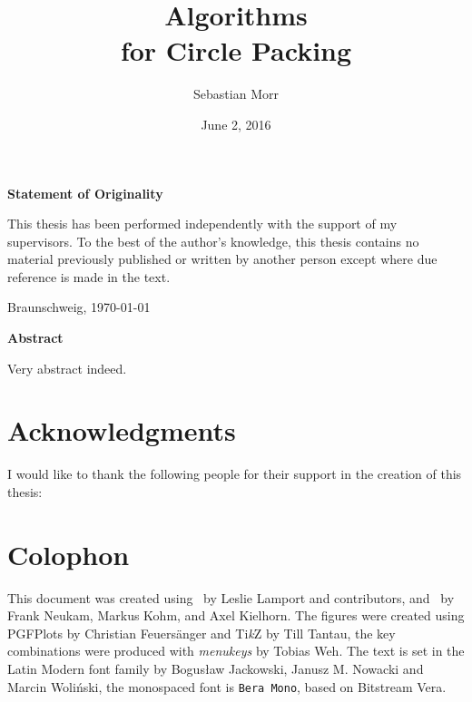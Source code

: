 \documentclass[%
    a4paper,              %
    style=print,          %
    bibliography=totoc,   %
    nexus,                %
    lnum,                 %
    extramargin,          %
]{tubsbook}
\title{Algorithms\\for Circle Packing}
\author{\sffamily\LARGE Sebastian Morr}
\date{\large June 2, 2016}
\begin{document}
\frontmatter %

\maketitle
\cleardoublepage

\thispagestyle{plain} %
\vspace*{7cm}
\centerline{\bfseries Statement of Originality}
\vspace*{1em}
\noindent
This thesis has been performed independently with the support of my supervisors.
To the best of the author's knowledge, this thesis contains no material previously
published or written by another person except where due reference is made in the text.

\par
  \bigskip\noindent Braunschweig, \today \par
  \vspace*{10mm}
  \hfill\hrulefill
\cleardoublepage

\thispagestyle{plain} %
\centerline{\bfseries Abstract}
\vspace*{1em}
\noindent
Very abstract indeed.
\cleardoublepage

%

\section*{Acknowledgments}

I would like to thank the following people for their support in the creation of this thesis:

\section*{Colophon}

This document was created using \LaTeXe\ by Leslie Lamport and contributors, and \KOMAScript\ by Frank Neukam, Markus Kohm, and Axel Kielhorn. The figures were created using PGFPlots by Christian Feuersänger and Ti\textit{k}Z by Till Tantau, the key combinations were produced with \emph{menukeys} by Tobias Weh. The text is set in the Latin Modern font family by Bogusław Jackowski, Janusz M. Nowacki and Marcin Woliński, the monospaced font is \texttt{Bera Mono}, based on Bitstream Vera.

\cleardoublepage
\setcounter{tocdepth}{2}
\end{document}
